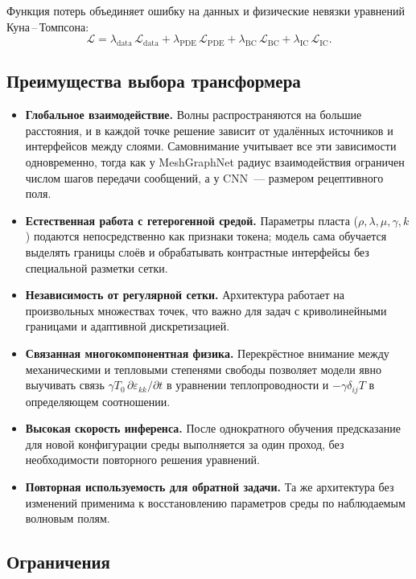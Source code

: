 \documentclass[12pt]{article}
\begin{document}
Функция потерь объединяет ошибку на данных и физические невязки уравнений Куна\,--\,Томпсона:
\[
\mathcal{L}
=
\lambda_{\mathrm{data}}\,\mathcal{L}_{\mathrm{data}}
+
\lambda_{\mathrm{PDE}}\,\mathcal{L}_{\mathrm{PDE}}
+
\lambda_{\mathrm{BC}}\,\mathcal{L}_{\mathrm{BC}}
+
\lambda_{\mathrm{IC}}\,\mathcal{L}_{\mathrm{IC}}.
\]

\subsection*{Преимущества выбора трансформера}

\begin{itemize}
\item \textbf{Глобальное взаимодействие.} Волны распространяются на большие расстояния, и в каждой точке решение зависит от удалённых источников и интерфейсов между слоями. Самовнимание учитывает все эти зависимости одновременно, тогда как у MeshGraphNet радиус взаимодействия ограничен числом шагов передачи сообщений, а у CNN~--- размером рецептивного поля.
\item \textbf{Естественная работа с гетерогенной средой.} Параметры пласта ($\rho, \lambda, \mu, \gamma, k$) подаются непосредственно как признаки токена; модель сама обучается выделять границы слоёв и обрабатывать контрастные интерфейсы без специальной разметки сетки.
\item \textbf{Независимость от регулярной сетки.} Архитектура работает на произвольных множествах точек, что важно для задач с криволинейными границами и адаптивной дискретизацией.
\item \textbf{Связанная многокомпонентная физика.} Перекрёстное внимание между механическими и тепловыми степенями свободы позволяет модели явно выучивать связь
$\gamma T_0\,\partial \varepsilon_{kk}/\partial t$
в уравнении теплопроводности и
$-\gamma \delta_{ij} T$
в определяющем соотношении.
\item \textbf{Высокая скорость инференса.} После однократного обучения предсказание для новой конфигурации среды выполняется за один проход, без необходимости повторного решения уравнений.
\item \textbf{Повторная используемость для обратной задачи.} Та же архитектура без изменений применима к восстановлению параметров среды по наблюдаемым волновым полям.
\end{itemize}

\subsection*{Ограничения}
\end{document}
